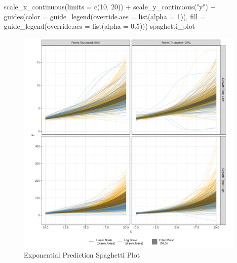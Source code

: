 \documentclass[print]{nuthesis}
\newenvironment{Shaded}{\begin{snugshade}}{\end{snugshade}}
\newcommand{\AttributeTok}[1]{\textcolor[rgb]{0.77,0.63,0.00}{#1}}
\newcommand{\DecValTok}[1]{\textcolor[rgb]{0.00,0.00,0.81}{#1}}
\newcommand{\FloatTok}[1]{\textcolor[rgb]{0.00,0.00,0.81}{#1}}
\newcommand{\FunctionTok}[1]{\textcolor[rgb]{0.00,0.00,0.00}{#1}}
\newcommand{\NormalTok}[1]{#1}
\newcommand{\SpecialCharTok}[1]{\textcolor[rgb]{0.00,0.00,0.00}{#1}}
\newcommand{\StringTok}[1]{\textcolor[rgb]{0.31,0.60,0.02}{#1}}
\begin{document}
\begin{Shaded}
\begin{Highlighting}[]
  \FunctionTok{scale\_x\_continuous}\NormalTok{(}\AttributeTok{limits =} \FunctionTok{c}\NormalTok{(}\DecValTok{10}\NormalTok{, }\DecValTok{20}\NormalTok{)) }\SpecialCharTok{+}
  \FunctionTok{scale\_y\_continuous}\NormalTok{(}\StringTok{"y"}\NormalTok{) }\SpecialCharTok{+}
  \FunctionTok{guides}\NormalTok{(}\AttributeTok{color =} \FunctionTok{guide\_legend}\NormalTok{(}\AttributeTok{override.aes =} \FunctionTok{list}\NormalTok{(}\AttributeTok{alpha =} \DecValTok{1}\NormalTok{)),}
         \AttributeTok{fill =} \FunctionTok{guide\_legend}\NormalTok{(}\AttributeTok{override.aes =} \FunctionTok{list}\NormalTok{(}\AttributeTok{alpha =} \FloatTok{0.5}\NormalTok{)))}
\NormalTok{spaghetti\_plot}
\end{Highlighting}
\end{Shaded}

\begin{figure}
\includegraphics[width=1\linewidth]{thesis_files/figure-latex/exponential-yloess-spaghetti-plot-1} \caption{Exponential Prediction Spaghetti Plot}\label{fig:exponential-yloess-spaghetti-plot}
\end{figure}
\end{document}
